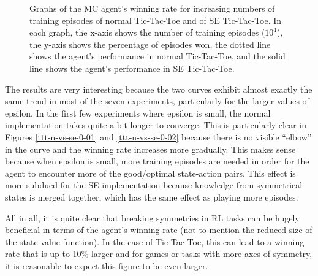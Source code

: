 \documentclass[11pt,a4paper]{report}
\begin{document}
\begin{figure}

    \caption{Graphs of the MC agent's winning rate for increasing numbers of training episodes of normal Tic-Tac-Toe and of SE Tic-Tac-Toe. In each graph, the x-axis shows the number of training episodes ($10^4$), the y-axis shows the percentage of episodes won, the dotted line shows the agent's performance in normal Tic-Tac-Toe, and the solid line shows the agent's performance in SE Tic-Tac-Toe.}
    \label{fig:tictactoe-normal-vs-symmetric-equality-performance}
\end{figure}

The results are very interesting because the two curves exhibit almost exactly the same trend in most of the seven experiments, particularly for the larger values of epsilon. In the first few experiments where epsilon is small, the normal implementation takes quite a bit longer to converge. This is particularly clear in Figures \ref{ttt-n-vs-se-0-01} and \ref{ttt-n-vs-se-0-02} because there is no visible ``elbow'' in the curve and the winning rate increases more gradually. This makes sense because when epsilon is small, more training episodes are needed in order for the agent to encounter more of the good/optimal state-action pairs. This effect is more subdued for the SE implementation because knowledge from symmetrical states is merged together, which has the same effect as playing more episodes.

All in all, it is quite clear that breaking symmetries in RL tasks can be hugely beneficial in terms of the agent's winning rate (not to mention the reduced size of the state-value function). In the case of Tic-Tac-Toe, this can lead to a winning rate that is up to 10\% larger and for games or tasks with more axes of symmetry, it is reasonable to expect this figure to be even larger.
\end{document}
